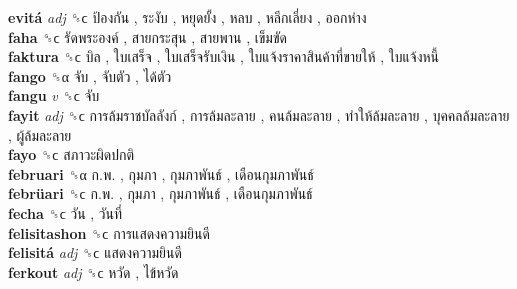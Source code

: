 \textbf{evitá} \emph{adj}  ␝ϲ   ป้องกัน ,  ระงับ ,  หยุดยั้ง ,  หลบ ,  หลีกเลี่ยง ,  ออกห่าง   \\
\textbf{faha} ␝ϲ   รัดพระองค์ ,  สายกระสุน ,  สายพาน ,  เข็มขัด   \\
\textbf{faktura} ␝ϲ   บิล ,  ใบเสร็จ ,  ใบเสร็จรับเงิน ,  ใบแจ้งราคาสินค้าที่ขายให้ ,  ใบแจ้งหนี้   \\
\textbf{fango} ␝α   จับ ,  จับตัว ,  ได้ตัว   \\
\textbf{fangu} \emph{v}  ␝ϲ   จับ   \\
\textbf{fayit} \emph{adj}  ␝ϲ   การล้มราชบัลลังก์ ,  การล้มละลาย ,  คนล้มละลาย ,  ทำให้ล้มละลาย ,  บุคคลล้มละลาย ,  ผู้ล้มละลาย   \\
\textbf{fayo} ␝ϲ   สภาวะผิดปกติ   \\
\textbf{februari} ␝α   ก.พ. ,  กุมภา ,  กุมภาพันธ์ ,  เดือนกุมภาพันธ์   \\
\textbf{febrüari} ␝ϲ   ก.พ. ,  กุมภา ,  กุมภาพันธ์ ,  เดือนกุมภาพันธ์   \\
\textbf{fecha} ␝ϲ   วัน ,  วันที่   \\
\textbf{felisitashon} ␝ϲ   การแสดงความยินดี   \\
\textbf{felisitá} \emph{adj}  ␝ϲ   แสดงความยินดี   \\
\textbf{ferkout} \emph{adj}  ␝ϲ   หวัด ,  ไข้หวัด   \\
